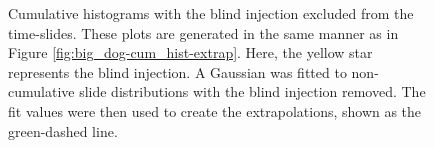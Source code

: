 \begin{figure}[p]
\center
{}
\caption{Cumulative histograms with the blind injection excluded from the
time-slides. These plots are generated in the same manner as in Figure
\ref{fig:big_dog-cum_hist-extrap}. Here, the yellow star represents the blind
injection. A Gaussian was fitted to non-cumulative slide distributions with the
blind injection removed. The fit values were then used to create the
extrapolations, shown as the green-dashed line.}
\label{fig:big_dog-cum_hist_no_littles-extrap}
\end{figure}

